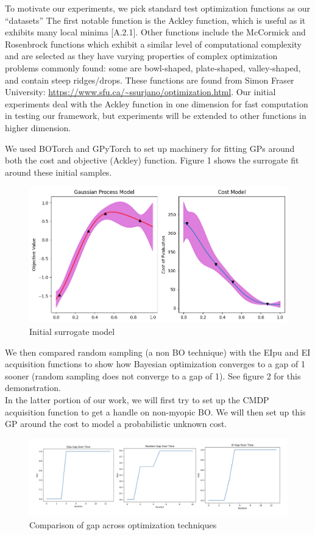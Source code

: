 \documentclass{article}
\begin{document}
To motivate our experiments, we pick standard test optimization functions as our ``datasets'' The first notable function is the Ackley function, which is useful as it exhibits many local minima [A.2.1]. Other functions include the McCormick and Rosenbrock functions which exhibit a similar level of computational complexity and are selected as they have varying properties of complex optimization problems commonly found: some are bowl-shaped, plate-shaped, valley-shaped, and contain steep ridges/drops. These functions are found from Simon Fraser University: \url{https://www.sfu.ca/~ssurjano/optimization.html}. Our initial experiments deal with the Ackley function in one dimension for fast computation in testing our framework, but experiments will be extended to other functions in higher dimension.

We used BOTorch and GPyTorch to set up machinery for fitting GPs around both the cost and objective (Ackley) function. Figure 1 shows the surrogate fit around these initial samples.

\begin{figure}
    \centering
    \includegraphics[width=0.7\linewidth]{graphics/gp_cost.png}
    \caption{Initial surrogate model}
\end{figure}

We then compared random sampling (a non BO technique) with the EIpu and EI acquisition functions to show how Bayesian optimization converges to a gap of 1 sooner (random sampling does not converge to a gap of 1). See figure 2 for this demonstration.\\

In the latter portion of our work, we will first try to set up the CMDP acquisition function to get a handle on non-myopic BO. We will then set up this GP around the cost to model a probabilistic unknown cost.

\begin{figure}
    \centering
    \includegraphics[width=1\linewidth]{graphics/gaps.png}
    \caption{Comparison of gap across optimization techniques}
\end{figure}
\end{document}
